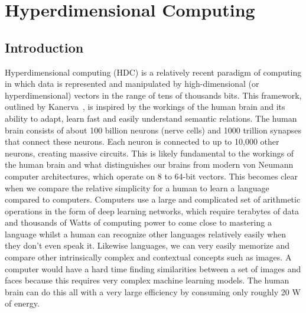 \chapter[Hyperdimensional computing]{Hyperdimensional Computing}
\section{Introduction}
Hyperdimensional computing (HDC) is a relatively recent paradigm of computing in which data is represented and manipulated by high-dimensional (or hyperdimensional) vectors in the range of tens of thousands bits. This framework, outlined by Kanerva~\cite{Kanerva2009}, is inspired by the workings of the human brain and its ability to adapt, learn fast and easily understand semantic relations. The human brain consists of about 100 billion neurons (nerve cells) and 1000 trillion synapses that connect these neurons. Each neuron is connected to up to 10,000 other neurons, creating massive circuits. This is likely fundamental to the workings of the human brain and what distinguishes our brains from modern von Neumann computer architectures, which operate on 8 to 64-bit vectors. This becomes clear when we compare the relative simplicity for a human to learn a language compared to computers. Computers use a large and complicated set of arithmetic operations in the form of deep learning networks, which require terabytes of data and thousands of Watts of computing power to come close to mastering a language whilst a human can recognize other languages relatively easily when they don't even speak it. Likewise languages, we can very easily memorize and compare other intrinsically complex and contextual concepts such as images. A computer would have a hard time finding similarities between a set of images and faces because this requires very complex machine learning models. The human brain can do this all with a very large efficiency by consuming only roughly 20 W of energy.

